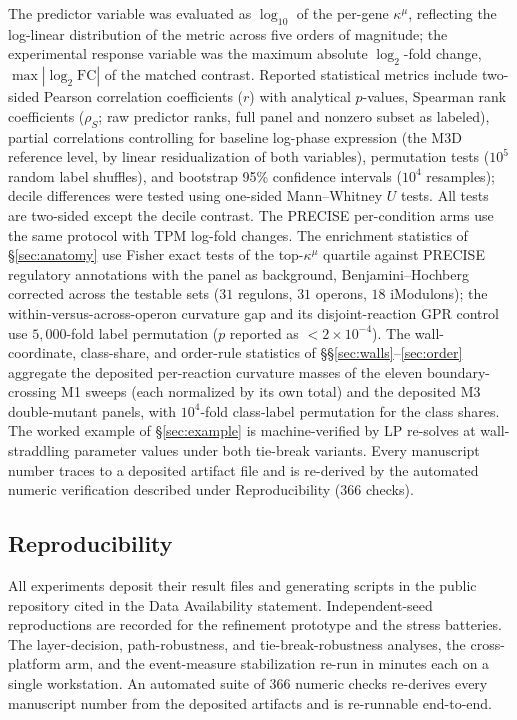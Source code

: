 \documentclass[11pt,a4paper]{article}
\theoremstyle{plain}
\theoremstyle{definition}
\theoremstyle{remark}
\newcommand{\kmu}{\kappa^{\mu}}
\begin{document}
The predictor variable was evaluated as $\log_{10}$ of the per-gene
$\kmu$, reflecting the log-linear distribution of the metric across
five orders of magnitude; the experimental response variable was the
maximum absolute $\log_2$-fold change, $\max|\log_2 \mathrm{FC}|$ of
the matched contrast. Reported statistical metrics include two-sided
Pearson correlation coefficients ($r$) with analytical $p$-values,
Spearman rank coefficients ($\rho_S$; raw predictor ranks, full
panel and nonzero subset as labeled), partial correlations
controlling for baseline log-phase expression (the M3D reference
level, by linear residualization of both variables), permutation
tests ($10^5$ random label shuffles), and bootstrap 95\% confidence
intervals ($10^4$ resamples); decile differences were tested using
one-sided Mann--Whitney $U$ tests. All tests are two-sided except
the decile contrast. The PRECISE per-condition arms use the same
protocol with TPM log-fold changes. The enrichment statistics of
\S\ref{sec:anatomy} use Fisher exact tests of the top-$\kmu$
quartile against PRECISE regulatory annotations with the panel as
background, Benjamini--Hochberg corrected across the testable sets
($31$ regulons, $31$ operons, $18$ iModulons); the
within-versus-across-operon curvature gap and its disjoint-reaction
GPR control use $5{,}000$-fold label permutation ($p$ reported as
$< 2 \times 10^{-4}$). The wall-coordinate, class-share, and
order-rule statistics of \S\S\ref{sec:walls}--\ref{sec:order}
aggregate the deposited per-reaction curvature masses of the eleven
boundary-crossing M1 sweeps (each normalized by its own total) and
the deposited M3 double-mutant panels, with $10^4$-fold class-label
permutation for the class shares. The worked example of
\S\ref{sec:example} is machine-verified by LP re-solves at
wall-straddling parameter values under both tie-break variants.
Every manuscript number traces
to a deposited artifact file and is re-derived by the automated
numeric verification described under Reproducibility
($366$ checks).

\subsection{Reproducibility}

All experiments deposit their result files and generating
scripts in the public repository cited in the Data Availability
statement. Independent-seed reproductions are recorded for the
refinement prototype and the stress batteries. The layer-decision,
path-robustness, and tie-break-robustness analyses, the cross-platform
arm, and the event-measure stabilization re-run in minutes each on a
single workstation. An automated suite of $366$ numeric checks
re-derives every manuscript number from the deposited artifacts and
is re-runnable end-to-end.
\end{document}
